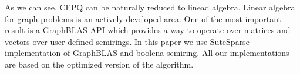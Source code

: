 As we can see, CFPQ can be naturally reduced to linead algebra. 
Linear algebra for graph problems is an actively developed area. 
One of the most important result is a GraphBLAS API which provides a way to operate over matrices and vectors over user-defined semirings.
In this paper we use SuteSparse implementation of GraphBLAS and boolena semiring.
All our implementations are based on the optimized version of the algorithm.
